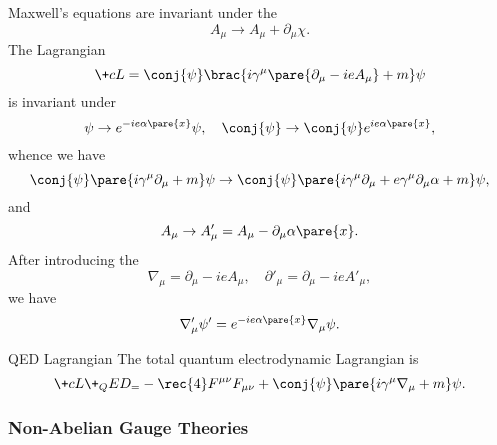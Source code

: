 \documentclass[hidelinks]{article}
\begin{document}
Maxwell's equations are invariant under the 
\[ A_\mu \rightarrow A_\mu + \partial_\mu \chi. \]
The Lagrangian
\[ \+cL = \conj{\psi}\brac{i\gamma^\mu\pare{\partial_\mu - ieA_\mu} + m}\psi \]
is invariant under
\[ \psi \rightarrow e^{-ie\alpha\pare{x}}\psi,\quad \conj{\psi} \rightarrow \conj{\psi}e^{ie\alpha\pare{x}}, \]
whence we have
\[ \conj{\psi}\pare{i\gamma^\mu\partial_\mu + m}\psi \rightarrow \conj{\psi}\pare{i\gamma^\mu\partial_\mu + e\gamma^\mu \partial_\mu \alpha + m}\psi, \]
and
\[ A_\mu \rightarrow A'_\mu = A_\mu - \partial_\mu \alpha\pare{x}. \]
After introducing the 
\[ \nabla_\mu = \partial_\mu - ieA_\mu,\quad \partial'_\mu = \partial_\mu - ieA'_\mu, \]
we have
\[ \nabla'_\mu \psi' = e^{-ie\alpha\pare{x}}\nabla_\mu \psi. \]
\vspace{-\baselineskip}
\begin{finaleq}{QED Lagrangian}
    The total quantum electrodynamic Lagrangian is
    \[ \+cL\+_QED_ = -\rec{4}F^{\mu\nu}F_{\mu\nu} + \conj{\psi}\pare{i\gamma^\mu \nabla_\mu + m}\psi. \]
\end{finaleq}


\subsubsection{Non-Abelian Gauge Theories} %
\label{ssub:non_abelian_gauge_theories}
\end{document}
